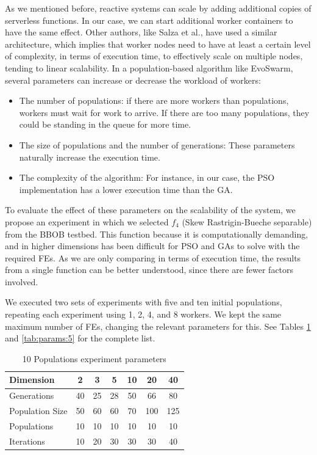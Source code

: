 \documentclass[review]{elsarticle}
\begin{document}
As we mentioned before, reactive systems can scale by adding additional copies
of serverless functions. In our case, we can start additional worker containers
to have the same effect. Other authors, like Salza et al., %
have used a
similar architecture, which implies that worker nodes need to have at least a certain level
of complexity, in terms of execution time,  to effectively scale on multiple
nodes, tending to linear scalability. In a population-based algorithm like
EvoSwarm, several parameters can increase or decrease the workload of workers:

\begin{itemize}
    \item The number of populations: if there are more workers than populations, workers
    must wait for work to arrive. If there are too many populations, they could be
    standing in the queue for more time.
    \item The size of populations and the number of generations:
    These parameters naturally increase the execution time.
    \item The complexity of the algorithm: For instance, in our case,
    the PSO implementation has a lower execution time than the GA.
\end{itemize}

To evaluate the effect of these parameters on the scalability of the system, we
propose  an experiment in which we selected $f_4$ (Skew Rastrigin-Bueche separable) from the
BBOB testbed. This function because it is computationally demanding,
and in higher dimensions has been difficult for PSO \cite{el2009black} and GAs
\cite{nicolau2009application} to solve with the required FEs. As we
are only comparing in terms of execution time, the results from a single function
can be better understood, since there are fewer factors involved. 

We executed two sets of experiments with five and ten initial populations,
repeating each experiment using  1, 2, 4, and 8 workers.  We kept the same
maximum number of FEs, changing the relevant parameters for this. 
See Tables \ref{tab:params:10} and \ref{tab:params:5} 
for the complete list. 

\begin{table}
    \small
    \caption{10 Populations experiment parameters
    }
    \label{tab:params:10}
    \centering
    \small
    \begin{tabular}{|l|c|c|c|c|c|c|}
      \hline
      Dimension        & 2  & 3  & 5  & 10 & 20  & 40  \\ \hline
      Generations      & 40 & 25 & 28 & 50 & 66  & 80  \\ \hline
      Population Size  & 50 & 60 & 60 & 70 & 100 & 125 \\ \hline
      Populations      & 10 & 10 & 10 & 10 & 10  & 10  \\ \hline
      Iterations       & 10 & 20 & 30 & 30 & 30  & 40  \\ \hline  
    \end{tabular}
\end{table}
\end{document}
